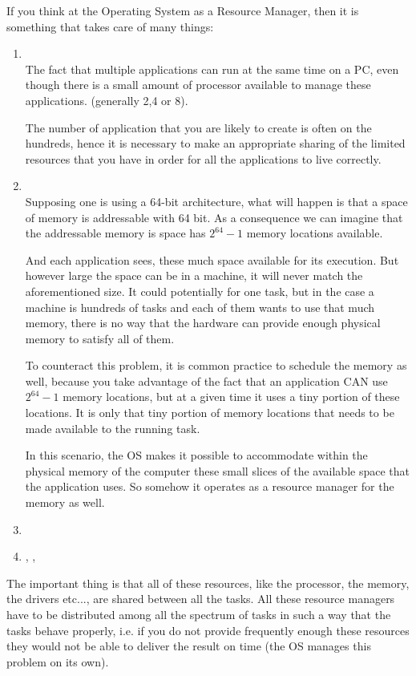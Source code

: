 If you think at the Operating System as a Resource Manager, then it is something that takes care of many things:
\begin{enumerate}
\item {}\\
The fact that multiple applications can run at the same time on a PC, even though there is a small amount of processor available to manage these applications. (generally 2,4 or 8).

The number of application that you are likely to create is often on the hundreds, hence it is necessary to make an appropriate sharing of the limited resources that you have in order for all the applications to live correctly.
\item {}\\
Supposing one is using a 64-bit architecture, what will happen is that a space of memory is addressable with 64 bit. As a consequence we can imagine that the addressable memory is space has $2^{64} - 1$ memory locations available.

And each application sees, these much space available for its execution. But however large the space can be in a machine, it will never match the aforementioned size. It could potentially for one task, but in the case a machine is hundreds of tasks and each of them wants to use that much memory, there is no way that the hardware can provide enough physical memory to satisfy all of them.

To counteract this problem, it is common practice to schedule the memory as well, because you take advantage of the fact that an application CAN use $2^{64} - 1$ memory locations, but at a given time it uses a tiny portion of these locations. It is only that tiny portion of memory locations that needs to be made available to the running task.

In this scenario, the OS makes it possible to accommodate within the physical memory of the computer these small slices of the available space that the application uses. So somehow it operates as a resource manager for the memory as well.
\item {}
\item {}, , 
\end{enumerate}
The important thing is that all of these resources, like the processor, the memory, the drivers etc..., are shared between all the tasks.
All these resource managers have to be distributed among all the spectrum of tasks in such a way that the tasks behave properly, i.e. if you do not provide frequently enough these resources they would not be able to deliver the result on time (the OS manages this problem on its own).

